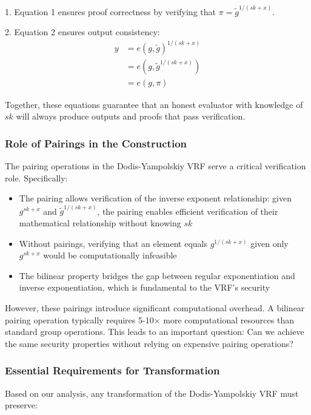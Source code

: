 1. Equation 1 ensures proof correctness by verifying that $\pi = \tilde{g}^{1/(sk+x)}$.

2. Equation 2 ensures output consistency:
\begin{align}
    y &= e(g, \tilde{g})^{1/(sk + x)} \\
    &= e(g, \tilde{g}^{1/(sk + x)}) \\
    &= e(g, \pi)
\end{align}

Together, these equations guarantee that an honest evaluator with knowledge of $sk$ will always produce outputs and proofs that pass verification.

\subsubsection{Role of Pairings in the Construction}

The pairing operations in the Dodis-Yampolskiy VRF serve a critical verification role. Specifically:

\begin{itemize}
    \item The pairing allows verification of the inverse exponent relationship: given $g^{sk+x}$ and $\tilde{g}^{1/(sk+x)}$, the pairing enables efficient verification of their mathematical relationship without knowing $sk$
    
    \item Without pairings, verifying that an element equals $g^{1/(sk+x)}$ given only $g^{sk+x}$ would be computationally infeasible
    
    \item The bilinear property bridges the gap between regular exponentiation and inverse exponentiation, which is fundamental to the VRF's security
\end{itemize}

However, these pairings introduce significant computational overhead. A bilinear pairing operation typically requires 5-10$\times$ more computational resources than standard group operations. This leads to an important question: Can we achieve the same security properties without relying on expensive pairing operations?

\subsubsection{Essential Requirements for Transformation}

Based on our analysis, any transformation of the Dodis-Yampolskiy VRF must preserve:

